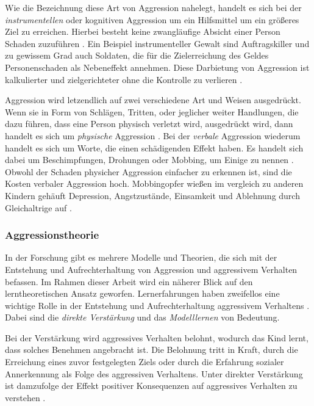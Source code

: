 Wie die Bezeichnung diese Art von Aggression nahelegt, handelt es sich bei der 
\textit{instrumentellen} oder kognitiven Aggression um ein Hilfsmittel um ein größeres Ziel zu erreichen. Hierbei besteht keine zwangläufige Absicht einer Person Schaden zuzuführen \parencite{instrumental_aggro, instrumental_dictionary}.
Ein Beispiel instrumenteller Gewalt sind Auftragskiller und zu gewissem Grad auch Soldaten, die für die Zielerreichung des Geldes Personenschaden als Nebeneffekt annehmen. Diese Darbietung von Aggression ist kalkulierter und zielgerichteter ohne die Kontrolle zu verlieren \parencite{impulsive_instrumental_aggro_healtline}.

Aggression wird letzendlich auf zwei verschiedene Art und Weisen ausgedrückt. Wenn sie in Form von Schlägen, Tritten, oder jeglicher weiter Handlungen, die dazu führen, dass eine Person physisch verletzt wird, ausgedrückt wird, dann handelt es sich um \textit{physische} Aggression \parencite{impulsive_instrumental_aggro_healtline, physische_verbale_aggro, physische_verbale_aggro_2}. Bei der \textit{verbale} Aggression wiederum handelt es sich um Worte, die einen schädigenden Effekt haben. Es handelt sich dabei um Beschimpfungen, Drohungen oder Mobbing, um Einige zu nennen \parencite{physische_verbale_aggro, physische_verbale_aggro_2, impulsive_instrumental_aggro_healtline}. Obwohl der Schaden physicher Aggression einfacher zu erkennen ist, sind die Kosten verbaler Aggression hoch. Mobbingopfer wießen im vergleich zu anderen Kindern gehäuft Depression, Angstzustände, Einsamkeit und Ablehnung durch Gleichaltrige auf \parencite{ausmaß_verbale_aggro}.



\subsubsection{Aggressionstheorie}    \label{subsubsec_2.1.3.2}
In der Forschung gibt es mehrere Modelle und Theorien, die sich  mit der Entstehung und Aufrechterhaltung von Aggression und aggressivem Verhalten befassen. Im Rahmen dieser Arbeit wird ein näherer Blick auf den lerntheoretischen Ansatz geworfen. Lernerfahrungen haben zweifellos eine wichtige Rolle in der Entstehung und Aufrechterhaltung aggressivem Verhaltens \parencite{Aggro_Theorie}. Dabei sind die \textit{direkte Verstärkung} und das \textit{Modelllernen} von Bedeutung. 

Bei der Verstärkung wird aggressives Verhalten belohnt, wodurch das Kind lernt, dass solches Benehmen angebracht ist. Die Belohnung tritt in Kraft, durch die Erreichung eines zuvor festgelegten Ziels oder durch die Erfahrung sozialer Annerkennung als Folge des aggressiven Verhaltens. Unter direkter Verstärkung ist damzufolge der Effekt positiver Konsequenzen auf aggressives Verhalten zu verstehen \parencite{Aggro_Theorie_Buch}.

